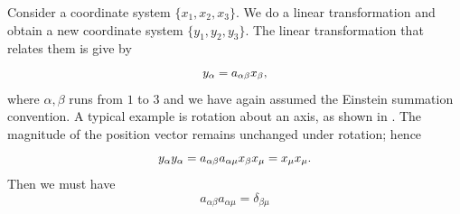\documentclass{tufte-book} %
\begin{document}
\begin{subappendices}
Consider a coordinate system $\{x_1,x_2,x_3\}$. We do a linear
transformation and obtain a new coordinate system
$\{y_1,y_2,y_3\}$. The linear transformation that relates them is give
by 
\begin{equation}
y_{\alpha} = a_{\alpha\beta} x_{\beta}\/,
\label{eq:transform}
\end{equation}
where $\alpha,\beta$ runs from $1$ to $3$ and we have again assumed
 the Einstein summation convention. A typical example is rotation about
 an axis, as shown in . 
The magnitude of the position vector remains unchanged under rotation;
hence
\begin{equation}
y_{\alpha}y_{\alpha} = a_{\alpha\beta}a_{\alpha\mu} x_{\beta}x_{\mu}
= x_{\mu}x_{\mu} \/.
\end{equation}
Then we must have 
\begin{equation}
a_{\alpha\beta}a_{\alpha\mu} = \delta_{\beta\mu}
\label{eq:delta}
\end{equation}

\end{subappendices}
\end{document}

